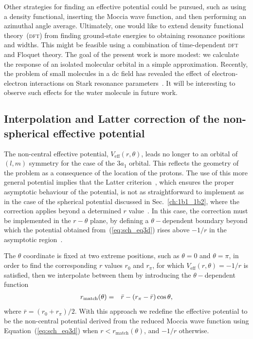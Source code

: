 Other strategies for finding an effective potential could be pursued,
such as using a density functional, inserting the Moccia wave function,
and then performing an azimuthal angle average. Ultimately, one would
like to extend density functional theory~(\textsc{dft}) from finding
ground-state energies to obtaining resonance positions and
widths. This might be feasible using a combination of time-dependent
\textsc{dft} and Floquet theory. The goal of the present work is more
modest: we calculate the response of an isolated molecular orbital in
a simple approximation. Recently, the problem of small molecules in a
dc field has revealed the effect of electron-electron interactions on
Stark resonance parameters~\cite{ScrinziJPhysB_ECS}. It will be
interesting to observe such effects for the water molecule in future
work.


\subsection{Interpolation and Latter correction of the
  non-spherical effective potential}
\label{ch:3a1_Latter}

The non-central effective potential, $V_{\mathrm{eff}}(r,\theta)$,
leads no longer to an orbital of $(l,m)$ symmetry for the case of the
$3a_{1}$ orbital. This reflects the geometry of the problem as a
consequence of the location of the protons. The use of this more
general potential implies that the Latter
criterion~\cite{LatterCor_1955}, which ensures the proper asymptotic
behaviour of the potential, is not as straightforward to implement as
in the case of the spherical potential discussed in
Sec.~\ref{ch:1b1_1b2}, where the correction applies beyond a
determined $r$ value~\cite{sarias_2016}. In this case, the correction
must be implemented in the $r-\theta$ plane, by defining a
$\theta-$dependent boundary beyond which the potential obtained
from~(\ref{eq:sch_eq3d}) rises above $-1/r$ in the asymptotic
region~\cite{sarias_2017}.

The $\theta$ coordinate is fixed at two extreme positions, such as
$\theta = 0$ and $\theta = \pi$, in order to find the corresponding
$r$ values $r_{0}$ and $r_{\pi}$, for which
$V_{\mathrm{eff}}(r,\theta) = -1/r$ is satisfied, then we interpolate
between them by introducing the $\theta-$dependent function
%
\begin{eqnarray}
r_{\rm{match}}(\theta) & = & \bar{r} - (r_{\pi} - \bar{r}) \cos\theta,
\label{eq:rMatch}
\end{eqnarray}
%
where $\bar{r} = (r_{0} + r_{\pi})/2$. With this approach we redefine
the effective potential to be the non-central potential derived from
the reduced Moccia wave function using Equation~(\ref{eq:sch_eq3d})
when $r < r_{\mathrm{match}}(\theta)$, and $-1/r$ otherwise.

